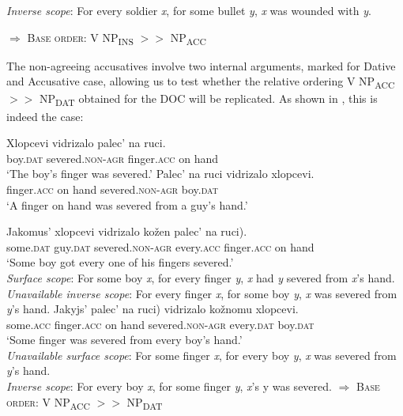 \documentclass[output=paper,colorlinks,citecolor=brown]{langscibook}
\begin{document}
\textit{Inverse scope}: For every soldier \textit{x}, for some bullet \textit{y}, \textit{x} was wounded with \textit{y}.

\z
$\Rightarrow$ \textsc{Base order}: V NP\textsubscript{INS} $>>$ NP\textsubscript{ACC}
\z


\noindent The non-agreeing accusatives involve two internal arguments, marked for Dative and Accusative case, allowing us to test whether the relative ordering V NP\textsubscript{ACC} $>>$ NP\textsubscript{DAT} obtained for the DOC will be replicated. As shown in , this is indeed the case:

\ea%
    \label{ex:antonyuk:27}
\ea
\gll   Xlopcevi   vidrizalo    palec’    na ruci. \\
  boy.\textsc{dat}    severed.\textsc{non-agr} finger.\textsc{acc} on hand\\
\glt `The boy’s finger was severed.’
\ex
\gll   Palec’     na ruci     vidrizalo     xlopcevi.\\
  finger.\textsc{acc}  on hand  severed.\textsc{non-agr}  boy.\textsc{dat}\\
\glt `A finger on hand was severed from a guy’s hand.’
\z
\z

\ea%
\label{ex:antonyuk:28}
\ea
\gll  Jakomus’ xlopcevi   vidrizalo     kožen palec’     \minsp{(} na ruci).\\
some.\textsc{dat} guy.\textsc{dat} severed.\textsc{non-agr}  every.\textsc{acc} finger.\textsc{acc} {} on hand\\
\glt ‘Some boy got every one of his fingers severed.’\\
\textit{Surface scope}: For some boy \textit{x}, for every finger \textit{y}, \textit{x} had \textit{y} severed from \textit{x}’s hand.\\
\textit{Unavailable inverse scope}: For every finger \textit{x}, for some boy \textit{y}, \textit{x} was severed from \textit{y}’s hand.
\ex
\gll Jakyjs’ palec’     \minsp{(} na ruci)   vidrizalo    kožnomu xlopcevi.\\
some.\textsc{acc} finger.\textsc{acc} {} on hand   severed.\textsc{non-agr}  every.\textsc{dat} boy.\textsc{dat}\\
\glt  ‘Some finger was severed from every boy’s hand.’\\
\textit{Unavailable surface scope}: For some finger \textit{x}, for every boy \textit{y}, \textit{x} was severed from \textit{y}’s hand.\\
\textit{ Inverse scope}: For every boy \textit{x}, for some finger \textit{y}, \textit{x}’s y was severed.
\z
$\Rightarrow$ \textsc{Base order}: V NP\textsubscript{ACC} $>>$ NP\textsubscript{DAT}
\z
\end{document}
